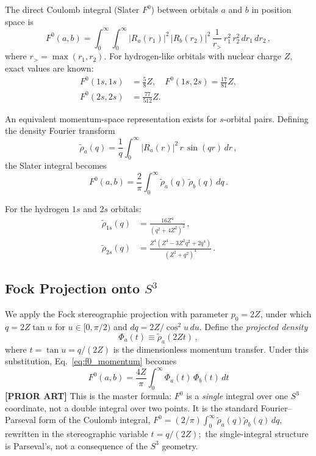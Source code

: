 \documentclass[aps,pra,twocolumn,superscriptaddress,longbibliography]{revtex4-2}
\begin{document}
The direct Coulomb integral (Slater $F^0$) between orbitals $a$ and $b$
in position space is
\begin{equation}
  F^0(a,b) = \int_0^\infty \!\!\int_0^\infty
  |R_a(r_1)|^2 \, |R_b(r_2)|^2 \, \frac{1}{r_>} \,
  r_1^2 \, r_2^2 \, dr_1 \, dr_2 \,,
  \label{eq:slater_f0}
\end{equation}
where $r_> = \max(r_1, r_2)$. For hydrogen-like orbitals with nuclear
charge $Z$, exact values are known:
\begin{align}
  F^0(1s,1s) &= \tfrac{5}{8}Z, \quad
  F^0(1s,2s) = \tfrac{17}{81}Z, \nonumber\\
  F^0(2s,2s) &= \tfrac{77}{512}Z.
  \label{eq:slater_exact}
\end{align}

An equivalent momentum-space representation exists for $s$-orbital pairs.
Defining the density Fourier transform
\begin{equation}
  \tilde{\rho}_a(q)
  = \frac{1}{q} \int_0^\infty |R_a(r)|^2 \, r \, \sin(qr) \, dr \,,
  \label{eq:density_ft}
\end{equation}
the Slater integral becomes
\begin{equation}
  F^0(a,b) = \frac{2}{\pi} \int_0^\infty
  \tilde{\rho}_a(q) \, \tilde{\rho}_b(q) \, dq \,.
  \label{eq:f0_momentum}
\end{equation}

For the hydrogen $1s$ and $2s$ orbitals:
\begin{align}
  \tilde{\rho}_{1s}(q) &= \frac{16Z^4}{(q^2 + 4Z^2)^2} \,,
  \label{eq:rho1s} \\[4pt]
  \tilde{\rho}_{2s}(q) &= \frac{Z^4(Z^4 - 3Z^2 q^2 + 2q^4)}{(Z^2 + q^2)^4} \,.
  \label{eq:rho2s}
\end{align}

\subsection{Fock Projection onto $S^3$}

We apply the Fock stereographic projection with parameter $p_0 = 2Z$,
under which $q = 2Z \tan u$ for $u \in [0, \pi/2)$ and
$dq = 2Z/\cos^2 u \, du$. Define the \emph{projected density}
\begin{equation}
  \Phi_a(t) \equiv \tilde{\rho}_a(2Zt) \,,
  \label{eq:projected_density}
\end{equation}
where $t = \tan u = q/(2Z)$ is the dimensionless momentum transfer.
Under this substitution, Eq.~\eqref{eq:f0_momentum} becomes
\begin{equation}
  \boxed{
    F^0(a,b) = \frac{4Z}{\pi} \int_0^\infty
    \Phi_a(t) \, \Phi_b(t) \, dt
  }
  \label{eq:f0_s3}
\end{equation}
\textbf{[PRIOR ART]} This is the master formula: $F^0$ is a \emph{single} integral over one
$S^3$ coordinate, not a double integral over two points.  It is the
standard Fourier--Parseval form of the Coulomb integral,
$F^0 = (2/\pi)\int_0^\infty \tilde\rho_a(q)\tilde\rho_b(q)\,dq$, rewritten
in the stereographic variable $t = q/(2Z)$;\ the single-integral
structure is Parseval's, not a consequence of the $S^3$ geometry.
\end{document}

